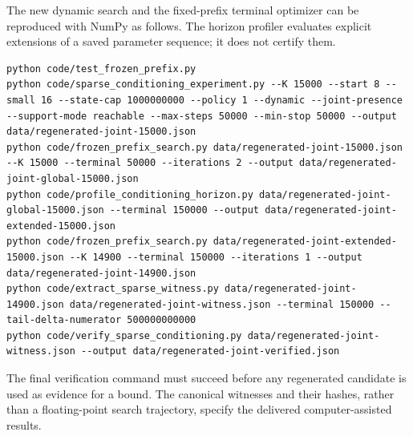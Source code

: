 \documentclass[11pt]{article}
\begin{document}
The new dynamic search and the fixed-prefix terminal optimizer can be
reproduced with NumPy as follows. The horizon profiler evaluates explicit
extensions of a saved parameter sequence; it does not certify them.
\begin{lstlisting}[basicstyle=\ttfamily\small,breaklines=true]
python code/test_frozen_prefix.py
python code/sparse_conditioning_experiment.py --K 15000 --start 8 --small 16 --state-cap 1000000000 --policy 1 --dynamic --joint-presence --support-mode reachable --max-steps 50000 --min-stop 50000 --output data/regenerated-joint-15000.json
python code/frozen_prefix_search.py data/regenerated-joint-15000.json --K 15000 --terminal 50000 --iterations 2 --output data/regenerated-joint-global-15000.json
python code/profile_conditioning_horizon.py data/regenerated-joint-global-15000.json --terminal 150000 --output data/regenerated-joint-extended-15000.json
python code/frozen_prefix_search.py data/regenerated-joint-extended-15000.json --K 14900 --terminal 150000 --iterations 1 --output data/regenerated-joint-14900.json
python code/extract_sparse_witness.py data/regenerated-joint-14900.json data/regenerated-joint-witness.json --terminal 150000 --tail-delta-numerator 500000000000
python code/verify_sparse_conditioning.py data/regenerated-joint-witness.json --output data/regenerated-joint-verified.json
\end{lstlisting}
The final verification command must succeed before any regenerated
candidate is used as evidence for a bound. The canonical witnesses and
their hashes, rather than a floating-point search trajectory, specify
the delivered computer-assisted results.
\end{document}
